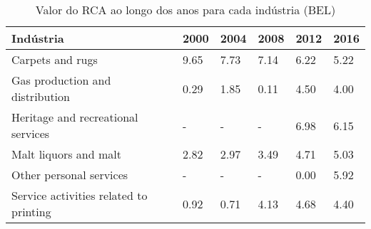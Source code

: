 \begin{table}
\centering
\caption{Valor do RCA ao longo dos anos para cada indústria (BEL)}
\begin{tabular}{p{6cm}p{1.5cm}p{1.5cm}p{1.5cm}p{1.5cm}p{1.5cm}}
\toprule
                             Indústria & 2000 & 2004 & 2008 & 2012 & 2016 \\
\midrule
                      Carpets and rugs & 9.65 & 7.73 & 7.14 & 6.22 & 5.22 \\
       Gas production and distribution & 0.29 & 1.85 & 0.11 & 4.50 & 4.00 \\
    Heritage and recreational services &    - &    - &    - & 6.98 & 6.15 \\
                 Malt liquors and malt & 2.82 & 2.97 & 3.49 & 4.71 & 5.03 \\
               Other personal services &    - &    - &    - & 0.00 & 5.92 \\
Service activities related to printing & 0.92 & 0.71 & 4.13 & 4.68 & 4.40 \\
\bottomrule
\end{tabular}
\end{table}
